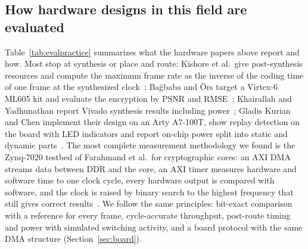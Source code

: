 \subsection{How hardware designs in this field are evaluated}\label{sec:evalpractice}
Table~\ref{tab:evalpractice} summarizes what the hardware papers above report and how. Most stop at synthesis or place and route: Kishore et al.\ give post-synthesis resources and compute the maximum frame rate as the inverse of the coding time of one frame at the synthesized clock~\cite{kishore2015}; Ba\u{g}baba and \"Ors target a Virtex-6 ML605 kit and evaluate the encryption by PSNR and RMSE~\cite{bagbaba2015}; Khairallah and Yadhunathan report Vivado synthesis results including power~\cite{khairallah2023}; Gladis Kurian and Chen implement their design on an Arty A7-100T, show replay detection on the board with LED indicators and report on-chip power split into static and dynamic parts~\cite{kurian2025}. The most complete measurement methodology we found is the Zynq-7020 testbed of Farahmand et al.\ for cryptographic cores: an AXI DMA streams data between DDR and the core, an AXI timer measures hardware and software time to one clock cycle, every hardware output is compared with software, and the clock is raised by binary search to the highest frequency that still gives correct results~\cite{farahmand2016}. We follow the same principles: bit-exact comparison with a reference for every frame, cycle-accurate throughput, post-route timing and power with simulated switching activity, and a board protocol with the same DMA structure (Section~\ref{sec:board}).

\begin{table}[t]
\caption{How related hardware designs were evaluated (from each source).}
\label{tab:evalpractice}
\centering\small\setlength{\tabcolsep}{4pt}
\end{table}

